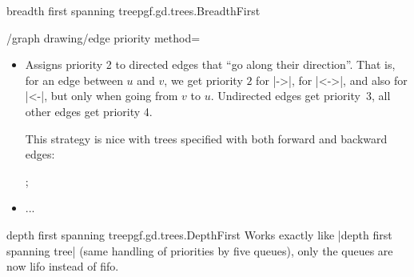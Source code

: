 \begin{gdalgorithm}{breadth first spanning tree}{pgf.gd.trees.BreadthFirst}
\begin{key}{/graph drawing/edge priority method=}
\begin{itemize}
      In practice, this means that the algorithm will favor
      forward-going edges and whenever a spanning tree can be computed
      using only the |->| edges, this spanning tree will be used. Only
      when these edges no longer suffice to build a spanning tree, we
      will also consider undirected or bidirected edges. The
      ``backward'' edges are only used as a last resort.
\begin{codeexample}[]
\tikz {};
\end{codeexample}
      Note that in the above example, we could also have used the key
      |no spanning tree edge| inside the |every group|. This would
      also cause the added edges to be ignored:
\begin{codeexample}[]
\tikz {};
\end{codeexample}     
    \item {}
      
      Assigns priority 2 to directed edges that ``go along their
      direction''. That is, for an edge between $u$ and $v$, we get
      priority $2$ for |->|, for |<->|, and also for |<-|, but only
      when going from $v$ to $u$. Undirected edges get priority~3, all
      other edges get priority 4.

      This strategy is nice with trees specified with both forward and
      backward edges:
\begin{codeexample}[]
\tikz {};
\end{codeexample}
    \item {}
      ...
    \end{itemize}
  \end{key}
\end{gdalgorithm}

\begin{gdalgorithm}{depth first spanning tree}{pgf.gd.trees.DepthFirst}
  Works exactly like |depth first spanning tree| (same handling of
  priorities by five queues), only the queues are now lifo instead of
  fifo. 
\end{gdalgorithm}


